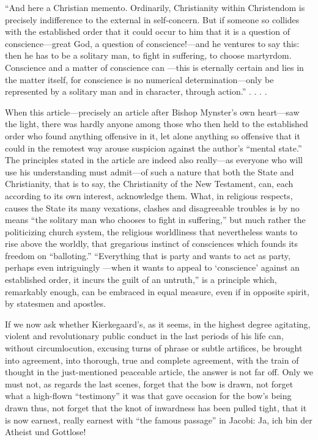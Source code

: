 \documentclass[12pt,a4paper]{article}
\newcommand{\opage}[1]{\marginnote{\footnotesize\textit{[#1]}}}
\begin{document}
``And here a Christian memento. Ordinarily,
Christianity within Christendom is precisely indifference to
the external in self-concern. But if someone so
collides with the established order that it could occur to him
that it is a question of conscience---great God, a
question of conscience!---and he ventures to say this:
then he has to be a solitary man, to fight in suffering, to
choose martyrdom. Conscience and a matter of conscience can
---this is eternally certain and lies in the matter itself, for
conscience is no numerical determination---only be
represented by a solitary man and in character, through
action.'' . . . .

When this article---precisely an article after Bishop Mynster's
own heart---saw the light, there was hardly anyone among
those who then held to the established order who
found anything offensive in it, let alone anything so offensive
that it could in the remotest way arouse suspicion against
the author's ``mental state.'' The principles stated in the article
are indeed also really---as everyone
who will use his understanding must admit---of such a nature that
both the State and Christianity, that is to say, the Christianity of the New
Testament, can, each according to its own interest,
acknowledge them. What, in religious respects,
causes the State its many vexations, clashes and disagreeable
troubles is by no means ``the solitary man who chooses
to fight in suffering,'' but much rather the politicizing
church system, the religious worldliness that nevertheless wants to rise above
the worldly,
that gregarious instinct of consciences which
founds its freedom on ``balloting.'' ``Everything that
is party and wants to act as party, perhaps even intriguingly
---when it wants to appeal to `conscience' against an established order,
it incurs the guilt of an untruth,'' is
a principle which, remarkably enough, can be embraced in equal measure, even if
in opposite spirit, by statesmen and apostles.

\opage{25}If we now ask whether Kierkegaard's, as it seems,
in the highest degree agitating, violent and revolutionary
public conduct in the last periods of his life can, without circumlocution,
excusing turns of phrase or subtle artifices,
be brought into agreement, into thorough, true and
complete agreement, with the train of thought in the just-mentioned
peaceable article, the answer is not far off.
Only we must not, as regards the last scenes, forget
that the bow is drawn, not forget what
a high-flown ``testimony'' it was that gave occasion for
the bow's being drawn thus, not forget that the knot of
inwardness has been pulled tight, that it is now earnest, really
earnest with ``the famous passage'' in Jacobi: Ja, ich bin
der Atheist und Gottlose!
\end{document}
